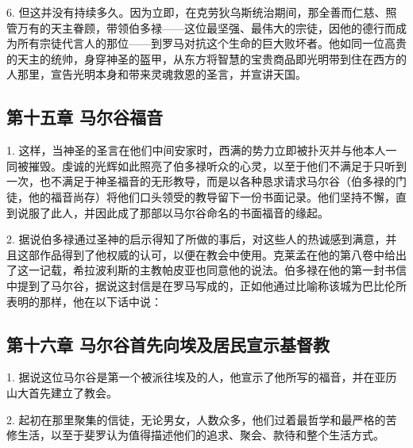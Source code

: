 6. 但这并没有持续多久。因为立即，在克劳狄乌斯统治期间，那全善而仁慈、照管万有的天主眷顾，带领伯多禄——这位最坚强、最伟大的宗徒，因他的德行而成为所有宗徒代言人的那位——到罗马对抗这个生命的巨大败坏者。他如同一位高贵的天主的统帅，身穿神圣的盔甲，从东方将智慧的宝贵商品即光明带到住在西方的人那里，宣告光明本身和带来灵魂救恩的圣言，并宣讲天国。\par


\subsection{第十五章 马尔谷福音}

1. 这样，当神圣的圣言在他们中间安家时，西满的势力立即被扑灭并与他本人一同被摧毁。虔诚的光辉如此照亮了伯多禄听众的心灵，以至于他们不满足于只听到一次，也不满足于神圣福音的无形教导，而是以各种恳求请求马尔谷（伯多禄的门徒，他的福音尚存）将他们口头领受的教导留下一份书面记录。他们坚持不懈，直到说服了此人，并因此成了那部以马尔谷命名的书面福音的缘起。\par

2. 据说伯多禄通过圣神的启示得知了所做的事后，对这些人的热诚感到满意，并且这部作品得到了他权威的认可，以便在教会中使用。克莱孟在他的第八卷中给出了这一记载，希拉波利斯的主教帕皮亚也同意他的说法。伯多禄在他的第一封书信中提到了马尔谷，据说这封信是在罗马写成的，正如他通过比喻称该城为巴比伦所表明的那样，他在以下话中说：\par


\subsection{第十六章 马尔谷首先向埃及居民宣示基督教}

1. 据说这位马尔谷是第一个被派往埃及的人，他宣示了他所写的福音，并在亚历山大首先建立了教会。\par

2. 起初在那里聚集的信徒，无论男女，人数众多，他们过着最哲学和最严格的苦修生活，以至于斐罗认为值得描述他们的追求、聚会、款待和整个生活方式。\par


